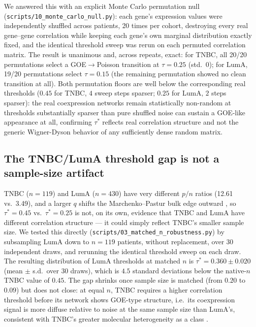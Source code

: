 \documentclass[11pt]{article}
\begin{document}
We answered this with an explicit Monte Carlo permutation null
(\texttt{scripts/10\_monte\_carlo\_null.py}): each gene's expression
values were independently shuffled across patients, 20 times per
cohort, destroying every real gene--gene correlation while keeping each
gene's own marginal distribution exactly fixed, and the identical
threshold sweep was rerun on each permuted correlation matrix. The
result is unanimous and, across repeats, exact: for TNBC, all 20/20
permutations select a GOE$\to$Poisson transition at $\tau=0.25$
(std.\ $0$); for LumA, 19/20 permutations select $\tau=0.15$ (the
remaining permutation showed no clean transition at all). Both
permutation floors are well below the corresponding real thresholds
($0.45$ for TNBC, $4$ sweep steps sparser; $0.25$ for LumA, $2$ steps
sparser): the real coexpression networks remain statistically
non-random at thresholds substantially sparser than pure shuffled
noise can sustain a GOE-like appearance at all, confirming $\tau^*$
reflects real correlation structure and not the generic
Wigner-Dyson behavior of any sufficiently dense random matrix.

\subsection{The TNBC/LumA threshold gap is not a sample-size artifact}
\label{sec:robustness}

TNBC ($n=119$) and LumA ($n=430$) have very different $p/n$ ratios
(12.61 vs.\ 3.49), and a larger $q$ shifts the Marchenko--Pastur bulk
edge outward \citep{marchenkopastur1967}, so $\tau^*=0.45$ vs.\
$\tau^*=0.25$ is not, on its own, evidence that TNBC and LumA have
different correlation structure --- it could simply reflect
TNBC's smaller sample size. We tested this directly
(\texttt{scripts/03\_matched\_n\_robustness.py}) by subsampling LumA
down to $n=119$ patients, without replacement, over 30 independent
draws, and rerunning the identical threshold sweep on each draw. The
resulting distribution of LumA thresholds at matched $n$ is
$\tau^*=0.360\pm0.020$ (mean $\pm$ s.d.\ over 30 draws), which is
$4.5$ standard deviations below the native-$n$ TNBC value of $0.45$.
The gap shrinks once sample size is matched (from $0.20$ to $0.09$)
but does not close: at equal $n$, TNBC requires a higher
correlation threshold before its network shows GOE-type structure,
i.e.\ its coexpression signal is more diffuse relative to noise at the
same sample size than LumA's, consistent with TNBC's greater molecular
heterogeneity as a class \citep{foulkes2010}.
\end{document}
